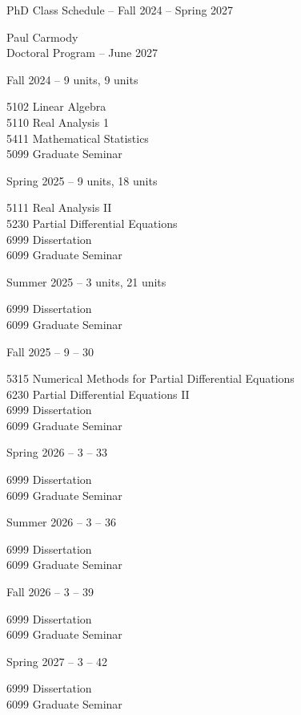 \documentclass[10pt,a4paper]{report}
\newcommand{\CLASSNAME}{PhD Class Schedule }
\newcommand{\STUDENTNAME}{Paul Carmody}
\newcommand{\ASSIGNMENT}{Doctoral Program }
\newcommand{\DUEDATE}{June 2027}
\newcommand{\SEMESTER}{Fall 2024 -- Spring 2027}
\begin{document}
\begin{center}
	\Large{\CLASSNAME -- \SEMESTER} 
\end{center}
\begin{center}
	\STUDENTNAME \\
	\ASSIGNMENT -- \DUEDATE\\
\end{center} 

\begin{description}
	\item Fall 2024 -- 9 units, 9 units

	5102 Linear Algebra\\
	5110 Real Analysis 1\\
	5411 Mathematical Statistics \\
	5099 Graduate Seminar
	
	\item Spring 2025 -- 9 units, 18 units
	
	5111 Real Analysis II\\
	5230 Partial Differential Equations \\
	6999 Dissertation \\
	6099 Graduate Seminar 
	
	\item Summer 2025 -- 3 units, 21 units
	
	6999 Dissertation\\
	6099 Graduate Seminar 
	
	\item Fall 2025 -- 9 -- 30
	
	5315 Numerical Methods for Partial Differential Equations\\
	6230 Partial Differential Equations II \\
	6999 Dissertation\\
	6099 Graduate Seminar 
	
	\item Spring 2026 -- 3 -- 33
	
	6999 Dissertation\\
	6099 Graduate Seminar 
	
	\item Summer 2026 -- 3 -- 36
	
	6999 Dissertation\\
	6099 Graduate Seminar 
	
	\item Fall 2026 -- 3 -- 39
	
	6999 Dissertation\\
	6099 Graduate Seminar 
	
	\item Spring 2027 -- 3 -- 42
	
	6999 Dissertation\\
	6099 Graduate Seminar 

\end{description}
\end{document}
